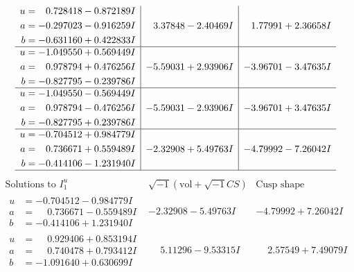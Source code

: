 \documentclass[1p]{elsarticle_modified}
\theoremstyle{definition}
\newcommand{\I}{\sqrt{-1}}
\begin{document}
$$\begin{array}{c|c|c}
\begin{aligned}
u &= \phantom{-}0.728418 - 0.872189 I \\
a &= -0.297023 - 0.916259 I \\
b &= -0.631160 + 0.422833 I\end{aligned}
 & \phantom{-}3.37848 - 2.40469 I & \phantom{-}1.77991 + 2.36658 I \\ \hline\begin{aligned}
u &= -1.049550 + 0.569449 I \\
a &= \phantom{-}0.978794 + 0.476256 I \\
b &= -0.827795 - 0.239786 I\end{aligned}
 & -5.59031 + 2.93906 I & -3.96701 - 3.47635 I \\ \hline\begin{aligned}
u &= -1.049550 - 0.569449 I \\
a &= \phantom{-}0.978794 - 0.476256 I \\
b &= -0.827795 + 0.239786 I\end{aligned}
 & -5.59031 - 2.93906 I & -3.96701 + 3.47635 I \\ \hline\begin{aligned}
u &= -0.704512 + 0.984779 I \\
a &= \phantom{-}0.736671 + 0.559489 I \\
b &= -0.414106 - 1.231940 I\end{aligned}
 & -2.32908 + 5.49763 I & -4.79992 - 7.26042 I\\
 \hline 
 \end{array}$$\newpage$$\begin{array}{c|c|c}  
\text{Solutions to }I^u_{1}& \I (\text{vol} + \sqrt{-1}CS) & \text{Cusp shape}\\
 \hline 
\begin{aligned}
u &= -0.704512 - 0.984779 I \\
a &= \phantom{-}0.736671 - 0.559489 I \\
b &= -0.414106 + 1.231940 I\end{aligned}
 & -2.32908 - 5.49763 I & -4.79992 + 7.26042 I \\ \hline\begin{aligned}
u &= \phantom{-}0.929406 + 0.853194 I \\
a &= \phantom{-}0.740478 + 0.793412 I \\
b &= -1.091640 + 0.630699 I\end{aligned}
 & \phantom{-}5.11296 - 9.53315 I & \phantom{-}2.57549 + 7.49079 I \\ \hline\begin{aligned}

\end{aligned}
\end{array}$$
\end{document}
